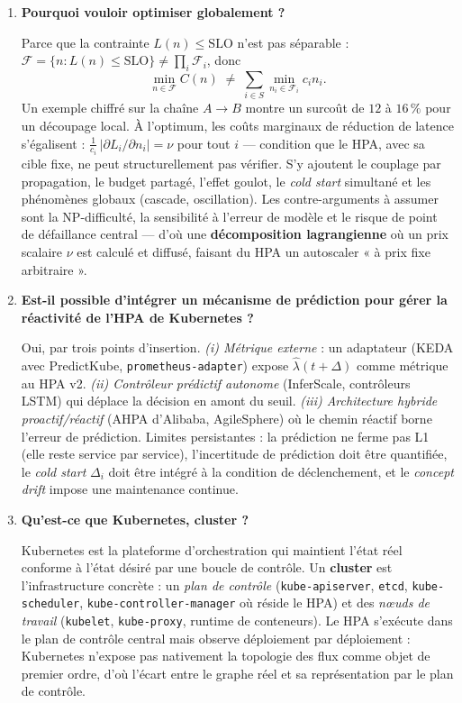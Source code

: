 \documentclass[11pt,a4paper]{article}
\begin{document}
\begin{enumerate}[label=\textbf{Q\arabic*.}, leftmargin=*, itemsep=0.6em]
\item \textbf{Pourquoi vouloir optimiser globalement ?}

Parce que la contrainte \(L(n) \le \text{SLO}\) n'est pas séparable : \( \mathcal{F} = \{n : L(n) \le \text{SLO}\} \neq \prod_i \mathcal{F}_i \), donc
\[
 \min_{n \in \mathcal{F}} C(n) \;\neq\; \sum_{i \in S} \min_{n_i \in \mathcal{F}_i} c_i n_i .
\]
Un exemple chiffré sur la chaîne \(A \to B\) montre un surcoût de \(12\) à \(16\,\%\) pour un découpage local. À l'optimum, les coûts marginaux de réduction de latence s'égalisent : \( \frac{1}{c_i}\,|\partial L_i/\partial n_i| = \nu \) pour tout \(i\) — condition que le HPA, avec sa cible fixe, ne peut structurellement pas vérifier. S'y ajoutent le couplage par propagation, le budget partagé, l'effet goulot, le \emph{cold start} simultané et les phénomènes globaux (cascade, oscillation). Les contre-arguments à assumer sont la NP-difficulté, la sensibilité à l'erreur de modèle et le risque de point de défaillance central — d'où une \textbf{décomposition lagrangienne} où un prix scalaire \( \nu \) est calculé et diffusé, faisant du HPA un autoscaler « à prix fixe arbitraire ».

\item \textbf{Est-il possible d'intégrer un mécanisme de prédiction pour gérer la réactivité de l'HPA de Kubernetes ?}

Oui, par trois points d'insertion. \emph{(i) Métrique externe} : un adaptateur (KEDA avec PredictKube, \texttt{prometheus-adapter}) expose \( \hat{\lambda}(t+\Delta) \) comme métrique au HPA v2. \emph{(ii) Contrôleur prédictif autonome} (InferScale, contrôleurs LSTM) qui déplace la décision en amont du seuil. \emph{(iii) Architecture hybride proactif/réactif} (AHPA d'Alibaba, AgileSphere) où le chemin réactif borne l'erreur de prédiction. Limites persistantes : la prédiction ne ferme pas L1 (elle reste service par service), l'incertitude de prédiction doit être quantifiée, le \emph{cold start} \( \Delta_i \) doit être intégré à la condition de déclenchement, et le \emph{concept drift} impose une maintenance continue.

\item \textbf{Qu'est-ce que Kubernetes, cluster ?}

Kubernetes est la plateforme d'orchestration qui maintient l'état réel conforme à l'état désiré par une boucle de contrôle. Un \textbf{cluster} est l'infrastructure concrète : un \emph{plan de contrôle} (\texttt{kube-apiserver}, \texttt{etcd}, \texttt{kube-scheduler}, \texttt{kube-controller-manager} où réside le HPA) et des \emph{nœuds de travail} (\texttt{kubelet}, \texttt{kube-proxy}, runtime de conteneurs). Le HPA s'exécute dans le plan de contrôle central mais observe déploiement par déploiement : Kubernetes n'expose pas nativement la topologie des flux comme objet de premier ordre, d'où l'écart entre le graphe réel et sa représentation par le plan de contrôle.


\end{enumerate}
\end{document}
